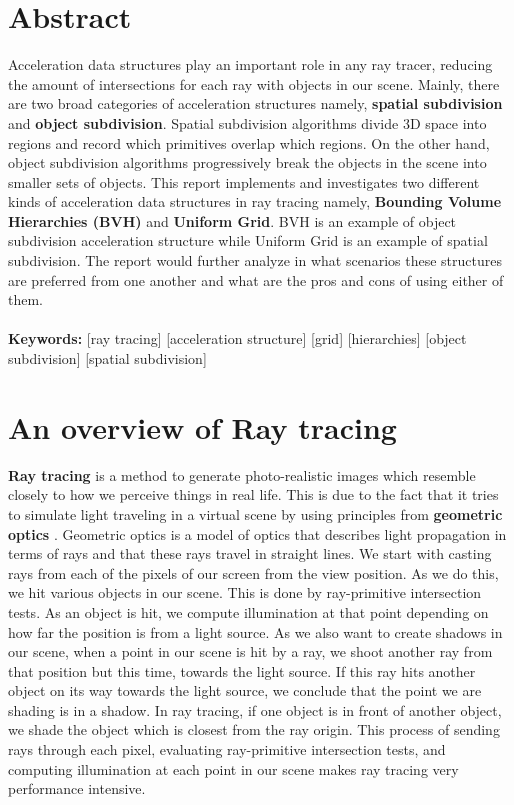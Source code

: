 \documentclass[11pt,a4paper]{article}
\begin{document}
\section{Abstract}
Acceleration data structures play an important role in any ray tracer, reducing the amount of intersections for each ray with objects in our scene. Mainly, there are two broad categories of acceleration structures namely, \textbf{spatial subdivision} and \textbf{object subdivision}. Spatial subdivision algorithms divide 3D space into regions and record which primitives overlap which regions. On the other hand, object subdivision algorithms progressively break the objects in the scene into smaller sets of objects. This report implements and investigates two different kinds of acceleration data structures in ray tracing namely, \textbf{Bounding Volume Hierarchies (BVH)} and \textbf{Uniform Grid}. BVH is an example of object subdivision acceleration structure while Uniform Grid is an example of spatial subdivision. The report would further analyze in what scenarios these structures are preferred from one another and what are the pros and cons of using either of them.
\\~\\
\noindent
\textbf{Keywords:} [ray tracing] [acceleration structure] [grid] [hierarchies] [object subdivision] [spatial subdivision]

\section{An overview of Ray tracing}
\textbf{Ray tracing} is a method to generate photo-realistic images which resemble closely to how we perceive things in real life. This is due to the fact that it tries to simulate light traveling in a virtual scene by using principles from \textbf{geometric optics} \cite{geometricoptics}. Geometric optics is a model of optics that describes light propagation in terms of rays and that these rays travel in straight lines.  We start with casting rays from each of the pixels of our
screen from the view position. As we do this, we hit various objects in our scene. This is done by
ray-primitive intersection tests. As an object is hit, we compute illumination at that point depending
on how far the position is from a light source. As we also want to create shadows in our scene, when
a point in our scene is hit by a ray, we shoot another ray from that position but this time, towards
the light source. If this ray hits another object on its way towards the light source, we conclude that
the point we are shading is in a shadow. In ray tracing, if one object is in front of another object, we
shade the object which is closest from the ray origin. This process of sending rays through each pixel,
evaluating ray-primitive intersection tests, and computing illumination at each point in our scene makes
ray tracing very performance intensive.
\end{document}
